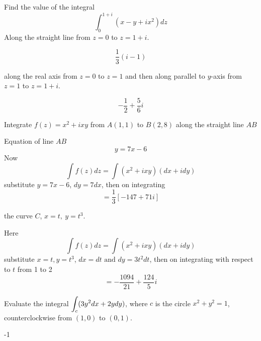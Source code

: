 \begin{problems}
\prob Find the value of the integral 
\[\int_0^{1+i}(x-y+ix^2)dz\]
\subprob Along the straight line from $z=0$ to $z=1+i$.
\begin{sol}\[\frac{1}{3}(i-1)\]\end{sol}
\subprob along the real axis from $z=0$ to $z=1$ and then along parallel to $y$-axis from $z=1$ to $z=1+i$.
\begin{sol}\[-\frac{1}{2}+\frac{5}{6}i\]\end{sol}
\prob Integrate $f(z) = x^2 + ixy$ from $A(1,1)$ to $B(2,8)$ along
\subprob the straight line $AB$
\begin{sol}
Equation of line $AB$
\[y=7x-6\]
Now 
\[\int f(z) dz  = \int (x^2 + ixy)(dx+idy)\]
substitute $y=7x-6$, $dy=7dx$, then on integrating
\[=\frac{1}{3}[-147+71i]\]
\end{sol}
\subprob the curve $C$, $x=t, ~y=t^3$.
\begin{sol}
Here
\[\int f(z) dz  = \int (x^2 + ixy)(dx+idy)\]
substitute $x=t,y=t^3$, $dx=dt\text{ and } dy=3t^2dt$, then on integrating with respect to $t$ from 1 to 2
\[=-\frac{1094}{21}+\frac{124}{5}i\]
\end{sol}

\prob Evaluate the integral $\displaystyle \int_c (3y^2dx+2ydy)$, where $c$ is the circle $x^2+y^2=1$, counterclockwise from $(1,0)$ to $(0,1)$.
\begin{sol}
-1
\end{sol}
\end{problems}

